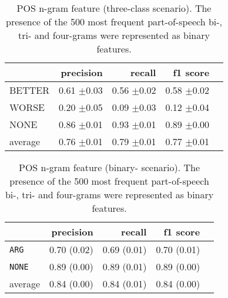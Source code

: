 	\begin{table}[h] 
		\centering 
		\caption{POS n-gram feature (three-class scenario). The presence of the 500 most frequent part-of-speech bi-, tri- and four-grams were represented as binary features.} 
		\label{  }
		\begin{tabular}{@{}lrrrr@{}}
			\toprule
			        & precision                & recall                   & f1 score                 \\ \midrule 
BETTER	&	 0.61 \scriptsize{$\pm$0.03} &	 0.56 \scriptsize{$\pm$0.02} &	 0.58 \scriptsize{$\pm$0.02}  \\ 
WORSE	&	 0.20 \scriptsize{$\pm$0.05} &	 0.09 \scriptsize{$\pm$0.03} &	 0.12 \scriptsize{$\pm$0.04}  \\ 
NONE	&	 0.86 \scriptsize{$\pm$0.01} &	 0.93 \scriptsize{$\pm$0.01} &	 0.89 \scriptsize{$\pm$0.00}  \\ 
average	&	 0.76 \scriptsize{$\pm$0.01} &	 0.79 \scriptsize{$\pm$0.01} &	 0.77 \scriptsize{$\pm$0.01}  \\ 
			\bottomrule
		\end{tabular}
	\end{table}
	
	\begin{table}[h] 
		\centering 
		\caption{POS n-gram feature (binary- scenario). The presence of the 500 most frequent part-of-speech bi-, tri- and four-grams were represented as binary features.} 
		\label{  }
		\begin{tabular}{@{}lrrrr@{}}
			\toprule
			        & precision                & recall                   & f1 score                 \\ \midrule 
			\texttt{ARG}     & 0.70 \scriptsize{(0.02)} & 0.69 \scriptsize{(0.01)} & 0.70 \scriptsize{(0.01)} \\ 
			\texttt{NONE}    & 0.89 \scriptsize{(0.00)} & 0.89 \scriptsize{(0.01)} & 0.89 \scriptsize{(0.00)} \\ 
			average & 0.84 \scriptsize{(0.00)} & 0.84 \scriptsize{(0.01)} & 0.84 \scriptsize{(0.00)} \\ 
			\bottomrule
		\end{tabular}
	\end{table}
	

